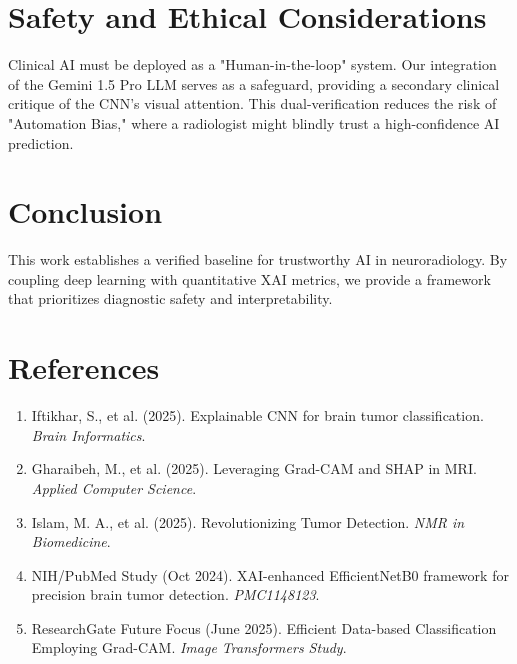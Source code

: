 \documentclass[a4paper,11pt]{article}
\begin{document}
\section{Safety and Ethical Considerations}
Clinical AI must be deployed as a "Human-in-the-loop" system. Our integration of the Gemini 1.5 Pro LLM serves as a safeguard, providing a secondary clinical critique of the CNN's visual attention. This dual-verification reduces the risk of "Automation Bias," where a radiologist might blindly trust a high-confidence AI prediction.

\section{Conclusion}
This work establishes a verified baseline for trustworthy AI in neuroradiology. By coupling deep learning with quantitative XAI metrics, we provide a framework that prioritizes diagnostic safety and interpretability.


 

\section*{References}
\begin{enumerate}
    \item Iftikhar, S., et al. (2025). Explainable CNN for brain tumor classification. \textit{Brain Informatics}.
    \item Gharaibeh, M., et al. (2025). Leveraging Grad-CAM and SHAP in MRI. \textit{Applied Computer Science}.
    \item Islam, M. A., et al. (2025). Revolutionizing Tumor Detection. \textit{NMR in Biomedicine}.
    \item NIH/PubMed Study (Oct 2024). XAI-enhanced EfficientNetB0 framework for precision brain tumor detection. \textit{PMC1148123}.
    \item ResearchGate Future Focus (June 2025). Efficient Data-based Classification Employing Grad-CAM. \textit{Image Transformers Study}.
\end{enumerate}
\end{document}
